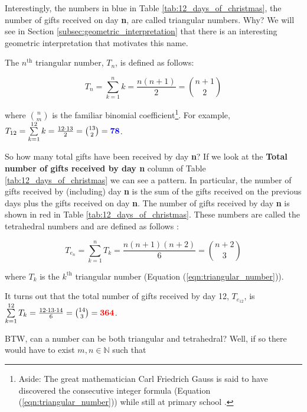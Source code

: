 \documentclass{article}
\theoremstyle{definition}
\begin{document}
\bigskip
\noindent
Interestingly, the numbers in blue in Table
\ref{tab:12_days_of_christmas}, the number of gifts received on
day {\bf n}, are called triangular numbers. Why? We will see in
Section \ref{subsec:geometric_interpretation} that there is an
interesting geometric interpretation that motivates this name.

\bigskip
\noindent
The $n^{\text{th}}$ triangular number, $T_{n}$, is defined as
follows:



\begin{equation}
T_{n}= \sum _{k=1}^{n} k = \frac {n(n+1)}{2} = {n+1 \choose 2}
\label{eqn:triangular_number}
\end{equation}


\noindent
where ${\displaystyle \binom{n}{m}}$ is the familiar binomial
coefficient\footnote{Aside: The great mathematician Carl
Friedrich Gauss is said to have discovered the consecutive
integer formula (Equation (\ref{eqn:triangular_number})) while
still at primary school \cite{gauss_day_of_reckoning}.}. For example,
$T_{12} = \sum\limits_{k=1}^{12} k = \frac{12 \cdot 13}{2} = {13
\choose 2} = \mathbf{\color{blue} 78}$.

\medskip
\noindent
So how many total gifts have been received by day {\bf n}?  If we
look at the {\bf Total number of gifts received by day n} column
of Table \ref{tab:12_days_of_christmas} we can see a pattern. In
particular, the number of gifts received by (including) day {\bf
n} is the sum of the gifts received on the previous days plus the
gifts received on day {\bf n}.  The number of gifts received by
day {\bf n} is shown in red in Table
\ref{tab:12_days_of_christmas}.  These numbers are called the
tetrahedral numbers and are defined as follows \cite{A000292}:


\begin{equation}
T_{e_n} = \sum\limits_{k=1}^{n} T_k = \frac{n(n+1)(n+2)}{6} = 
          \binom{n+2}{3}
\label{eqn:tetrahedral_number}
\end{equation}

\bigskip
\noindent
where $T_{k}$ is the $k^{\text{th}}$ triangular number 
(Equation (\ref{eqn:triangular_number})).

\vspace{0.74em}
\noindent
It turns out that the total number of gifts received by day 12,
$T_{e_{12}}$, is $\sum\limits_{k=1}^{12} T_k =\frac{12 \cdot 13
\cdot 14}{6} = \binom{14}{3} = \mathbf{\color{red} {364}}$.

\noindent
BTW, can a number can be both triangular and tetrahedral? Well,
if so there would have to exist $m,n \in \mathbb{N}$ such
that
\end{document}

